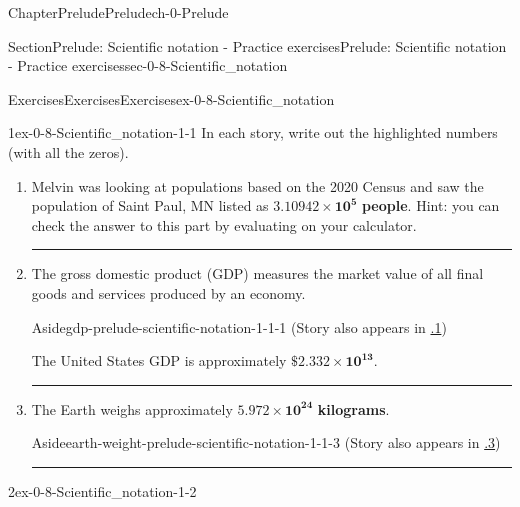 \documentclass[twoside,11pt,]{book}
\newcommand{\xreffont}{\relax}
\newcommand{\terminology}[1]{\textbf{#1}}
\newlength{\workspacestrutwidth}
\numberwithin{equation}{section}
\begin{document}
\begin{chapterptx}{Chapter}{Prelude}{}{Prelude}{}{}{ch-0-Prelude}
\typeout{************************************************}
%
\begin{sectionptx}{Section}{Prelude: Scientific notation - Practice exercises}{}{Prelude: Scientific notation - Practice exercises}{}{}{sec-0-8-Scientific_notation}
%
%
\typeout{************************************************}
\typeout{************************************************}
%
\begin{exercises-subsection-numberless}{Exercises}{Exercises}{}{Exercises}{}{}{ex-0-8-Scientific_notation}
\begin{divisionexercise}{1}{}{}{ex-0-8-Scientific_notation-1-1}%
In each story, write out the highlighted numbers (with all the zeros).%
\begin{enumerate}[label=(\alph*),ref=\alph*]%
\item\label{population-prelude-scientific-notation}Melvin was looking at populations based on the 2020 Census and saw the population of Saint Paul, MN listed as \(\mathbf{3.10942 \times 10^{5}}\) \terminology{people}. Hint: you can check the answer to this part by evaluating on your calculator.%
\par\rule{\workspacestrutwidth}{0.5in}%
\item\label{gdp-prelude-scientific-notation}The gross domestic product (GDP) measures the market value of all final goods and services produced by an economy. \begin{aside}{Aside}{}{gdp-prelude-scientific-notation-1-1-1}%
(Story also appears in \hyperlink{gdp-scientific-notation}{{\xreffont 1.5.1}})%
\end{aside}
 The United States GDP is approximately \(\mathbf{\$2.332 \times 10^{13}}\).%
\par\rule{\workspacestrutwidth}{0.5in}%
\item\label{earth-weight-prelude-scientific-notation}The Earth weighs approximately \(\mathbf{5.972 \times 10^{24}}\) \terminology{kilograms}. \begin{aside}{Aside}{}{earth-weight-prelude-scientific-notation-1-1-3}%
(Story also appears in \hyperlink{planet-weight-scientific-notation}{{\xreffont 1.5.3}})%
\end{aside}
%
\par\rule{\workspacestrutwidth}{0.5in}%
\end{enumerate}%
\end{divisionexercise}%
 \begin{divisionexercise}{2}{}{}{ex-0-8-Scientific_notation-1-2}%

\end{divisionexercise}
\end{exercises-subsection-numberless}
\end{sectionptx}
\end{chapterptx}
\end{document}
